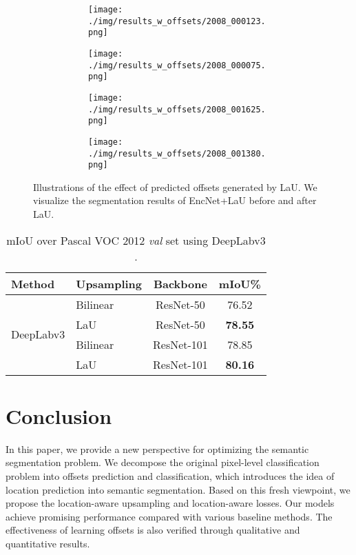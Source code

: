 \documentclass[10pt,twocolumn,letterpaper]{article}
\begin{document}
\begin{figure}[t]
\begin{subfigure}[t]{0.11\textwidth}
\begin{subfigure}[t]{\textwidth}
                \texttt{[image: ./img/results\_w\_offsets/2008\_000123.png]}
            \end{subfigure}\vspace{.1ex}

\begin{subfigure}[t]{\textwidth}
                \texttt{[image: ./img/results\_w\_offsets/2008\_000075.png]}
            \end{subfigure}\vspace{.1ex}

\begin{subfigure}[t]{\textwidth}
                \texttt{[image: ./img/results\_w\_offsets/2008\_001625.png]}
            \end{subfigure}\vspace{.1ex}

            \begin{subfigure}[t]{\textwidth}
                \texttt{[image: ./img/results\_w\_offsets/2008\_001380.png]}
        \label{6d}
            \end{subfigure}
    \end{subfigure}
        \caption{Illustrations of the effect of predicted offsets generated by LaU. We visualize the segmentation results of EncNet+LaU before and after LaU.}
\label{view2}
\end{figure}


\begin{table}
  \caption{mIoU over Pascal VOC 2012 \textit{val} set using DeepLabv3 \cite{deeplabv3}.}
  \label{sample-table}
  \centering
\begin{tabular}{llcc}
\hline    
Method    & Upsampling & Backbone   & mIoU\%\\
\hline  \hline  
    \multirow{4}{*}{DeepLabv3}  & Bilinear & ResNet-50  & 76.52 \\
    & LaU & ResNet-50 & \textbf{78.55} \\
    & Bilinear & ResNet-101  & 78.85 \\ 
   & LaU & ResNet-101 & \textbf{80.16} \\ 
\hline
\end{tabular}
\label{deeplab}
\end{table}

\section{Conclusion}
In this paper, we provide a new perspective for optimizing the semantic segmentation problem. We decompose the original pixel-level classification problem into offsets prediction and classification, which introduces the idea of location prediction into semantic segmentation. Based on this fresh viewpoint, we propose the location-aware upsampling and location-aware losses. Our models achieve promising performance compared with various baseline methods. The effectiveness of learning offsets is also verified through qualitative and quantitative results.
\end{document}
